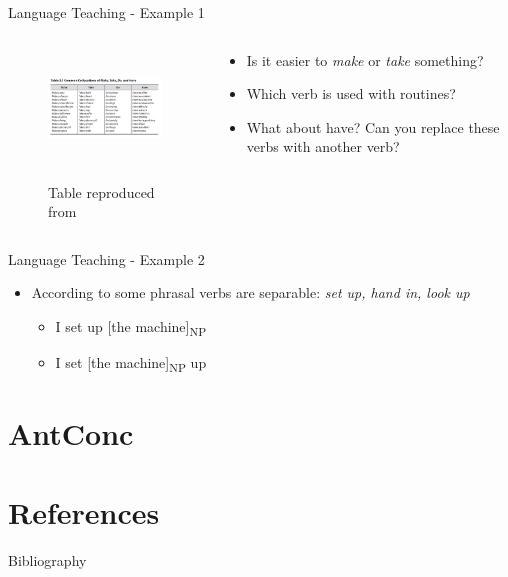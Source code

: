 \documentclass{beamer}
\begin{document}
\begin{frame}{Language Teaching - Example 1}
	\begin{columns}
		\begin{column}{6cm}
			\begin{figure}
				\includegraphics[height=3cm]{maketake.jpg}
					\begin{center}
						\begin{tiny}
						Table reproduced from \cite[p.39]{liu_using_2017}
						\end{tiny}
					\end{center}
			\end{figure}
		\end{column}
		
        \begin{column}{4cm}
		\begin{itemize}
			\item Is it easier to \textit{make} or \textit{take} something?
            \item Which verb is used with routines?
            \item What about have? Can you replace these verbs with another verb?
		\end{itemize}
\end{column}
\end{columns}
\end{frame}


\begin{frame}{Language Teaching - Example 2}
	\begin{itemize}
		\item According to \cite{cowan_teachers_2008} some phrasal verbs are separable: \textit{set up, hand in, look up}
        \begin{itemize}
        \item I set up {[}the machine{]}\textsubscript{NP}
        \item I set {[}the machine{]}\textsubscript{NP} up 
        \end{itemize}
	\end{itemize}
\end{frame}



\section{AntConc}
	
\section{References}

\begin{frame}[fragile]{Bibliography}




\end{frame}
\end{document}
